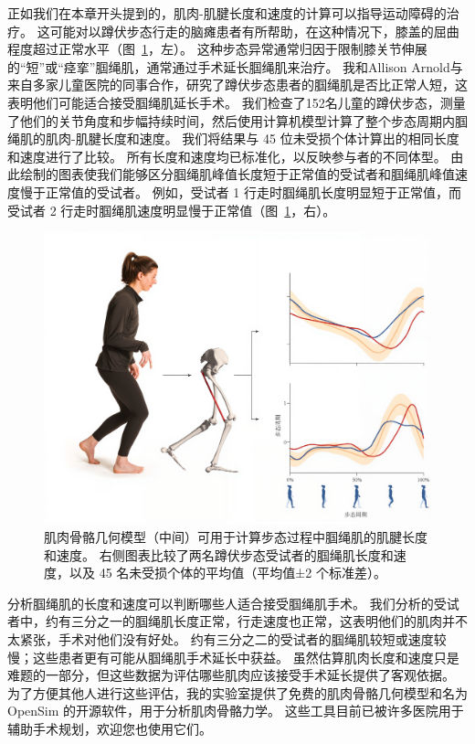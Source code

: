 正如我们在本章开头提到的，肌肉-肌腱长度和速度的计算可以指导运动障碍的治疗。
这可能对以蹲伏步态行走的脑瘫患者有所帮助，在这种情况下，膝盖的屈曲程度超过正常水平（图~\ref{fig:6_10}，左）。
这种步态异常通常归因于限制膝关节伸展的“短”或“痉挛”腘绳肌，通常通过手术延长腘绳肌来治疗。
我和Allison Arnold与来自多家儿童医院的同事合作，研究了蹲伏步态患者的腘绳肌是否比正常人短，这表明他们可能适合接受腘绳肌延长手术。
我们检查了152名儿童的蹲伏步态，测量了他们的关节角度和步幅持续时间，然后使用计算机模型计算了整个步态周期内腘绳肌的肌肉-肌腱长度和速度。
我们将结果与 45 位未受损个体计算出的相同长度和速度进行了比较。
所有长度和速度均已标准化，以反映参与者的不同体型。
由此绘制的图表使我们能够区分腘绳肌峰值长度短于正常值的受试者和腘绳肌峰值速度慢于正常值的受试者。
例如，受试者 1 行走时腘绳肌长度明显短于正常值，而受试者 2 行走时腘绳肌速度明显慢于正常值（图~\ref{fig:6_10}，右）。


\begin{figure}[!htb]
	\centering
	\includegraphics[width=1.0\linewidth]{chap6/6_10}
	\caption{肌肉骨骼几何模型（中间）可用于计算步态过程中腘绳肌的肌腱长度和速度。
		右侧图表比较了两名蹲伏步态受试者的腘绳肌长度和速度，以及 45 名未受损个体的平均值（平均值±2 个标准差）\cite{arnold2006role}。 \label{fig:6_10}}
\end{figure}


分析腘绳肌的长度和速度可以判断哪些人适合接受腘绳肌手术。
我们分析的受试者中，约有三分之一的腘绳肌长度正常，行走速度也正常，这表明他们的肌肉并不太紧张，手术对他们没有好处。
约有三分之二的受试者的腘绳肌较短或速度较慢；这些患者更有可能从腘绳肌手术延长中获益。
虽然估算肌肉长度和速度只是难题的一部分，但这些数据为评估哪些肌肉应该接受手术延长提供了客观依据。
为了方便其他人进行这些评估，我的实验室提供了免费的肌肉骨骼几何模型和名为 OpenSim 的开源软件，用于分析肌肉骨骼力学。
这些工具目前已被许多医院用于辅助手术规划，欢迎您也使用它们。



